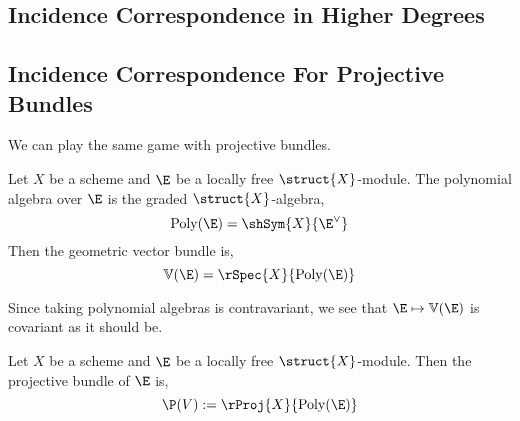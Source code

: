 \documentclass[12pt]{article}
\begin{document}
\subsection{Incidence Correspondence in Higher Degrees}


\subsection{Incidence Correspondence For Projective Bundles}

We can play the same game with projective bundles. 

\begin{defn}
Let $X$ be a scheme and $\E$ be a locally free $\struct{X}$-module. The polynomial algebra over $\E$ is the graded $\struct{X}$-algebra,
\[ \mathrm{Poly}(\E) = \shSym{X}{\E^\vee} \]
Then the geometric vector bundle is,
\[ \mathbb{V}(\E) = \rSpec{X}{\mathrm{Poly}(\E)} \]
\end{defn}

\begin{rmk}
Since taking polynomial algebras is contravariant, we see that $\E \mapsto \mathbb{V}(\E)$ is covariant as it should be.
\end{rmk}

\begin{defn}
Let $X$ be a scheme and $\E$ be a locally free $\struct{X}$-module. Then the projective bundle of $\E$ is,
\[ \P(V) := \rProj{X}{\mathrm{Poly}(\E)} \]
\end{defn}
\end{document}
